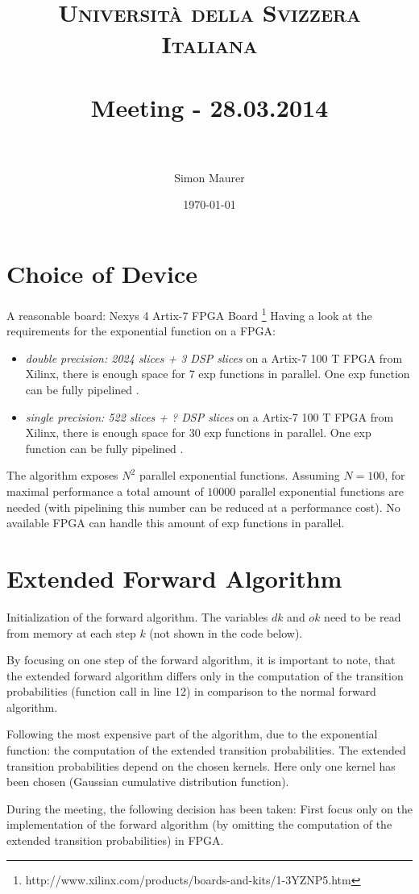 \documentclass[paper=a4, fontsize=11pt]{scrartcl} %
\title{	
\normalfont \normalsize 
\textsc{Università della Svizzera Italiana} \\ [25pt] %
\horrule{0.5pt} \\[0.4cm] %
\huge Meeting - 28.03.2014 \\ %
\horrule{2pt} \\[0.5cm] %
}
\author{Simon Maurer} %
\date{\normalsize\today} %
\begin{document}
\maketitle %


\section{Choice of Device}
A reasonable board: Nexys 4 Artix-7 FPGA Board
\footnote{http://www.xilinx.com/products/boards-and-kits/1-3YZNP5.htm}
Having a look at the requirements for the exponential function on a FPGA:
\begin{itemize}
	\item \emph{double precision: 2024 slices + 3 DSP slices} on a Artix-7 100 T
		FPGA from Xilinx, there is enough space for 7 exp functions in parallel.
		One exp function can be fully pipelined \cite{RSSI08_Pottathuparambil}.
	\item \emph{single precision: 522 slices + ? DSP slices} on a Artix-7 100 T
		FPGA from Xilinx, there is enough space for 30 exp functions in
		parallel. One exp function can be fully pipelined \cite{ICFPT05_Detrey}.
\end{itemize}

The algorithm exposes $ N^2 $ parallel exponential functions. Assuming
$ N=100 $, for maximal performance a total amount of $ 10000 $ parallel
exponential functions are needed (with pipelining this number can be reduced at
a performance cost). No available FPGA can handle this amount of exp functions
in parallel.

\section{Extended Forward Algorithm}
Initialization of the forward algorithm. The variables $ dk $ and $ ok $ need
to be read from memory at each step  $ k $ (not shown in the code below).

By focusing on one step of the forward algorithm, it is important to note, that
the extended forward algorithm differs only in the computation of the transition
probabilities (function call in line 12) in comparison to the normal forward
algorithm.

Following the most expensive part of the algorithm, due to the exponential
function: the computation of the extended transition probabilities. The
extended transition probabilities depend on the chosen kernels. Here only one
kernel has been chosen (Gaussian cumulative distribution function).

During the meeting, the following decision has been taken: First focus only on
the implementation of the forward algorithm (by omitting the computation of
the extended transition probabilities) in FPGA.
\end{document}
